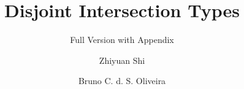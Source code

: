 \documentclass{llncs}
\begin{document}

\title{Disjoint Intersection Types}
\subtitle{Full Version with Appendix}
\author{Zhiyuan Shi \and Bruno C. d. S. Oliveira}

\maketitle

\begin{abstract}
  
\end{abstract}










\newpage



\clearpage
\onecolumn

\appendix




\end{document}
